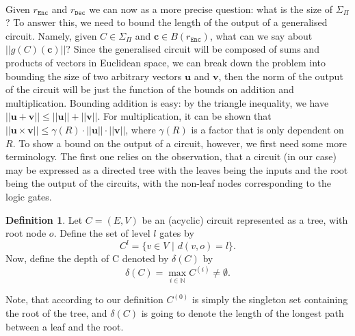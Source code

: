 \documentclass{article}
\theoremstyle{definition}
\newtheorem{definition}{Definition}[section]
\theoremstyle{example}
\newcommand{\Enc}{\texttt{Enc}}
\newcommand{\Dec}{\texttt{Dec}}
\newcommand{\Nat}{\mathbb{N}}
\renewcommand{\vec}[1]{\mathbf{#1}}
\newcommand{\norm}[1]{||#1||}
\begin{document}
\paragraph{} Given $r_\Enc$ and $r_\Dec$ we can now as a more precise question:
what is the size of $\Sigma_\Pi$? To answer this, we need to bound the length of
the output of a generalised circuit. Namely, given $C \in \Sigma_\Pi$ and $\vec{c}
\in B(r_\Enc)$, what can we say about $\norm{g(C)(\vec{c})}$? Since the
generalised circuit will be composed of sums and products of vectors in
Euclidean space, we can break down the problem into bounding the size of two
arbitrary vectors $\vec{u}$ and $\vec{v}$, then the norm of the output of the
circuit will be just the function of the bounds on addition and multiplication.
Bounding addition is easy: by the triangle inequality, we have $\norm{\vec{u} +
  \vec{v}} \leq \norm{\vec{u}} + \norm{\vec{v}}$. For multiplication, it can be
shown that $\norm{\vec{u} \times \vec{v}} \leq \gamma(R) \cdot \norm{\vec{u}}
\cdot \norm{\vec{v}}$, where $\gamma(R)$ is a factor that is only dependent on $R$.
To show a bound on the output of a circuit, however, we first need some more
terminology.
The first one relies on the observation, that a circuit (in our case) may be
expressed as a directed tree with the leaves being the inputs and the root being
the output of the circuits, with the non-leaf nodes corresponding to the logic
gates.
\begin{definition}
  Let $C = (E, V)$ be an (acyclic) circuit represented as a tree, with root node
  $o$. Define the set of level $l$ gates by 
  \[
    C^{l} = \{v \in V\,\,|\,\, d(v, o) = l\}.
  \]
  Now, define the depth of C denoted by $\delta(C)$ by
  \[
    \delta(C) = \max_{i \in \Nat} C^{(i)} \neq \emptyset.
  \]
\end{definition}
Note, that according to our definition $C^{(0)}$ is simply the singleton set
containing the root of the tree, and $\delta(C)$
is going to denote the length of the longest path between a leaf and the root.
\end{document}
